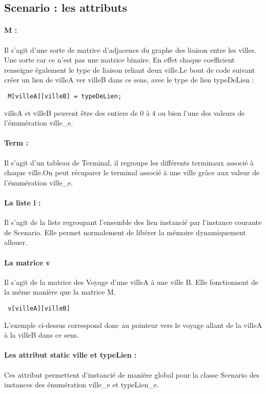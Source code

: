 \documentclass[a4paper]{article}
\begin{document}
		\subsection{Scenario : les attributs}
		\paragraph{M :}
		Il s'agit d'une sorte de matrice d'adjacence du graphe des liaison entre les villes. Une sorte car ce n'est pas une matrice binaire. En effet chaque coefficient renseigne également le type de liaison reliant deux ville.\newline Le bout de code suivant créer un lien de villeA ver villeB dans ce sens, avec le type de lien typeDeLien :
		\begin{center}\verb| M[villeA][villeB] = typeDeLien;|\end{center}
		villeA et villeB peuvent être des entiers de 0 à 4 ou bien l'une des valeurs de l'énumération ville\_e.
		\paragraph{Term :}
		Il s'agit d'un tableau de Terminal, il regroupe les différents terminaux associé à chaque ville.\newline On peut récuparer le terminal associé à une ville grâce aux valeur de l'énumération ville\_e.
		\paragraph{La liste l :}
		Il s'agit de la liste regroupant l'ensemble des lien instancié par l'instance courante de Scenario. Elle permet normalement de libérer la mémoire dynamiquement allouer.
		\paragraph{La matrice v}
		Il s'agit de la matrice des Voyage d'une villeA à une ville B. Elle fonctionnent de la même manière que la matrice M.
		\begin{center}\verb| v[villeA][villeB]|\end{center}
		L'exemple ci-dessus correspond donc au pointeur vers le voyage allant de la villeA à la villeB dans ce sens.
		\paragraph{Les attribut static ville et typeLien :}
		Ces attribut permettent d'instancié de manière global pour la classe Scenario des instances des énumération ville\_e et typeLien\_e.
\end{document}
